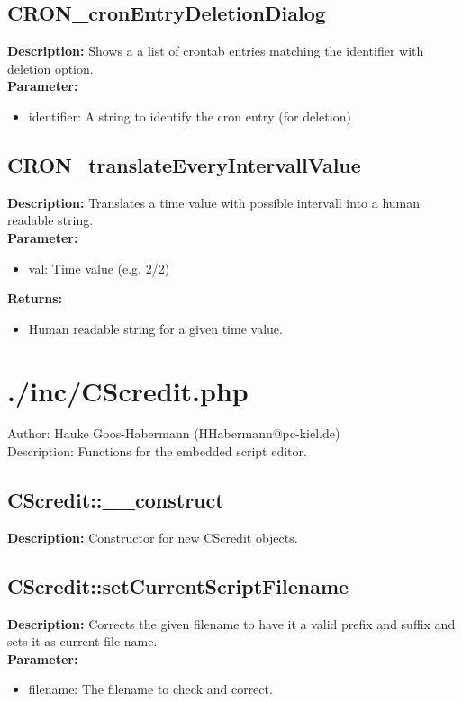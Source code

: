 \subsection{CRON\_cronEntryDeletionDialog}
\textbf{Description:} Shows a a list of crontab entries matching the identifier with deletion option.\\
\textbf{Parameter:}
\begin{itemize}
\item identifier: A string to identify the cron entry (for deletion)
\end{itemize}

\subsection{CRON\_translateEveryIntervallValue}
\textbf{Description:} Translates a time value with possible intervall into a human readable string.\\
\textbf{Parameter:}
\begin{itemize}
\item val: Time value (e.g. 2/2)
\end{itemize}
\textbf{Returns:}
\begin{itemize}
\item Human readable string for a given time value.
\end{itemize}

\newpage\section{./inc/CScredit.php}
 Author: Hauke Goos-Habermann (HHabermann@pc-kiel.de)\\
 Description: Functions for the embedded script editor.\\

\subsection{CScredit::\_\_construct}
\textbf{Description:} Constructor for new CScredit objects.\\

\subsection{CScredit::setCurrentScriptFilename}
\textbf{Description:} Corrects the given filename to have it a valid prefix and suffix and sets it as current file name.\\
\textbf{Parameter:}
\begin{itemize}
\item filename: The filename to check and correct.
\end{itemize}

